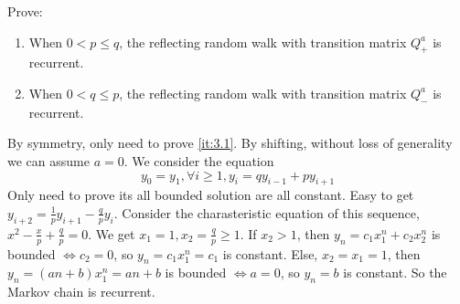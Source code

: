 \documentclass{ctexart}
\begin{document}
\begin{problem}\label{pro:3}
  Prove:
  \begin{enumerate}
    \item \label{it:3.1}When \(0 < p \leq q\), the reflecting random walk with transition matrix \(Q^a_+\) is recurrent.
    \item When \(0 < q \leq p\), the reflecting random walk with transition matrix \(Q^a_-\) is recurrent.
  \end{enumerate}
\end{problem}

\begin{solution}
  By symmetry, only need to prove \ref{it:3.1}. By shifting, without loss of generality we can assume \(a=0\).
  We consider the equation
  \[
    y_0=y_1,\forall i \geq 1,y_i=qy_{i-1}+py_{i+1}
  \]
  Only need to prove its all bounded solution are all constant.
  Easy to get \(y_{i+2}=\frac{1}{p}y_{i+1}-\frac{q}{p}y_{i}\).
  Consider the charasteristic equation of this sequence, \(x^2-\frac{x}{p}+\frac{q}{p}=0\).
  We get \(x_1=1,x_2=\frac{q}{p} \geq 1\).
  If \(x_2>1\), then \(y_n=c_1 x_1^n + c_2 x_2^n\) is bounded \(\iff c_2=0\), so \(y_n=c_1 x_1^n=c_1\) is constant.
  Else, \(x_2=x_1=1\), then \(y_n=(an+b)x_1^n=an+b\) is bounded \(\iff a=0\), so \(y_n=b\) is constant.
  So the Markov chain is recurrent.
\end{solution}
\end{document}
